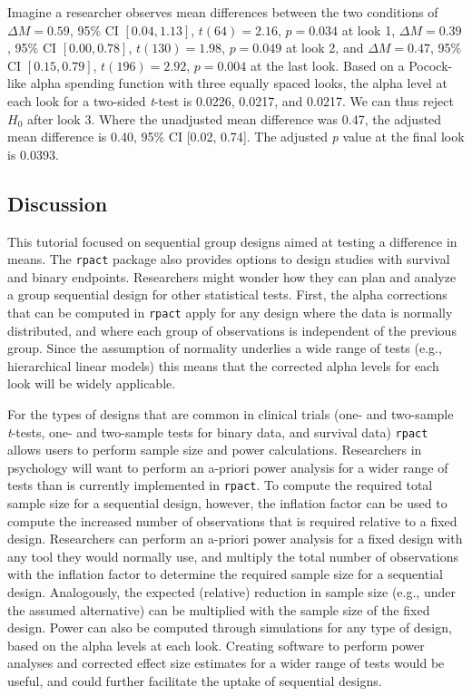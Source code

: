 \documentclass[
  english,
  ,man,floatsintext]{apa6}
\begin{document}
Imagine a researcher observes mean differences between the two conditions of \(\Delta M = 0.59\), 95\% CI \([0.04, 1.13]\), \(t(64) = 2.16\), \(p = 0.034\) at look 1, \(\Delta M = 0.39\), 95\% CI \([0.00, 0.78]\), \(t(130) = 1.98\), \(p = 0.049\) at look 2, and \(\Delta M = 0.47\), 95\% CI \([0.15, 0.79]\), \(t(196) = 2.92\), \(p = 0.004\) at the last look. Based on a Pocock-like alpha spending function with three equally spaced looks, the alpha level at each look for a two-sided \emph{t}-test is 0.0226, 0.0217, and 0.0217. We can thus reject \(H_0\) after look 3. Where the unadjusted mean difference was 0.47, the adjusted mean difference is 0.40, 95\% CI {[}0.02, 0.74{]}. The adjusted \emph{p} value at the final look is 0.0393.

\hypertarget{discussion}{%
\subsection{Discussion}\label{discussion}}

This tutorial focused on sequential group designs aimed at testing a difference in means. The \texttt{rpact} package also provides options to design studies with survival and binary endpoints. Researchers might wonder how they can plan and analyze a group sequential design for other statistical tests. First, the alpha corrections that can be computed in \texttt{rpact} apply for any design where the data is normally distributed, and where each group of observations is independent of the previous group. Since the assumption of normality underlies a wide range of tests (e.g., hierarchical linear models) this means that the corrected alpha levels for each look will be widely applicable.

For the types of designs that are common in clinical trials (one- and two-sample \emph{t}-tests, one- and two-sample tests for binary data, and survival data) \texttt{rpact} allows users to perform sample size and power calculations. Researchers in psychology will want to perform an a-priori power analysis for a wider range of tests than is currently implemented in \texttt{rpact}. To compute the required total sample size for a sequential design, however, the inflation factor can be used to compute the increased number of observations that is required relative to a fixed design. Researchers can perform an a-priori power analysis for a fixed design with any tool they would normally use, and multiply the total number of observations with the inflation factor to determine the required sample size for a sequential design. Analogously, the expected (relative) reduction in sample size (e.g., under the assumed alternative) can be multiplied with the sample size of the fixed design. Power can also be computed through simulations for any type of design, based on the alpha levels at each look. Creating software to perform power analyses and corrected effect size estimates for a wider range of tests would be useful, and could further facilitate the uptake of sequential designs.
\end{document}
